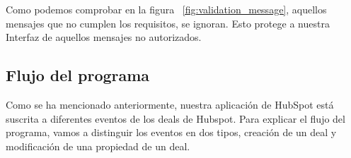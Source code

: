 Como podemos comprobar en la figura ~\ref{fig:validation_message}, aquellos mensajes que no cumplen los requisitos, se ignoran. Esto protege a nuestra Interfaz de aquellos mensajes no autorizados.




\subsection{Flujo del programa}

Como se ha mencionado anteriormente, nuestra aplicación de HubSpot está suscrita a diferentes eventos de los deals de Hubspot.
Para explicar el flujo del programa, vamos a distinguir los eventos en dos tipos, creación de un deal y modificación de una propiedad de un deal.

